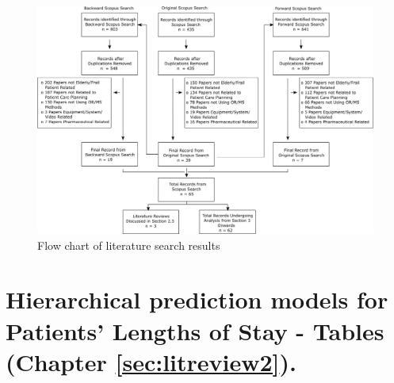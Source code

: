 \documentclass[thesis.tex]{subfiles}
\begin{document}
\begin{landscape}


\begin{figure}[h!]

\centering
  \includegraphics[scale=0.7]{Chapter2/Figures/Flowchart.png}
 \caption{Flow chart of literature search results}  
\label{appfig:SearchDiag}
\end{figure}
\end{landscape}


\section{Hierarchical prediction models for Patients’
Lengths of Stay - Tables (Chapter \ref{sec:litreview2}).}\label{sec:applr2}
\end{document}
